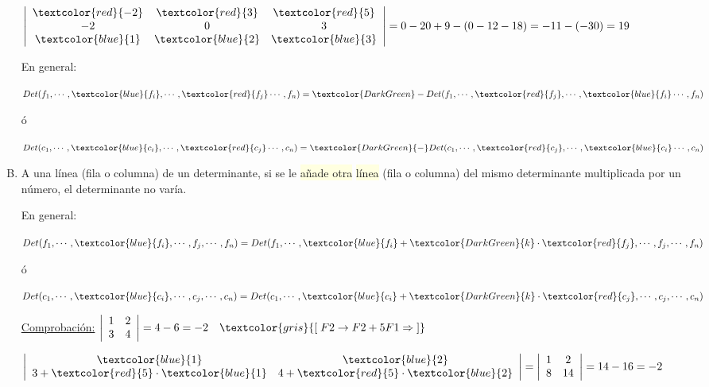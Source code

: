 \begin{enumerate}[P.D. 1]
 $\left| \begin{array}{ccc} \textcolor{red}{-2}& \textcolor{red}{3}& \textcolor{red}{5} \\-2&0&3\\ \textcolor{blue}{1}& \textcolor{blue}{2}& \textcolor{blue}{3}  \end{array} \right|= 
0-20+9-(0-12-18)=-11-(-30)=19$

En general: 

$Det(f_1, \cdots , \textcolor{blue}{f_i}, \cdots , \textcolor{red}{f_j} \cdots , f_n)=\textcolor{DarkGreen}- Det(f_1, \cdots , \textcolor{red}{f_j}, \cdots , \textcolor{blue}{f_i} \cdots , f_n)$

ó 

$Det(c_1, \cdots , \textcolor{blue}{c_i}, \cdots , \textcolor{red}{c_j} \cdots , c_n)=\textcolor{DarkGreen}{-} Det(c_1, \cdots , \textcolor{red}{c_j}, \cdots , \textcolor{blue}{c_i} \cdots , c_n)$

\item A una línea (fila o columna) de un determinante, si se le \colorbox{LightYellow}{añade otra} \colorbox{LightYellow}{línea} (fila o columna) del mismo determinante multiplicada por un número, el determinante no varía.

En general:

\small{$Det(f_1, \cdots , \textcolor{blue}{f_i},\cdots , f_j,  \cdots , f_n)= Det(f_1, \cdots , \textcolor{blue}{f_i}+ \textcolor{DarkGreen}{k}\cdot  \textcolor{red}{f_j}, \cdots, f_j,  \cdots , f_n)$} 

\normalsize{ó} 

\small{$Det(c_1, \cdots , \textcolor{blue}{c_i},\cdots , c_j,  \cdots , c_n)= Det(c_1, \cdots , \textcolor{blue}{c_i}+ \textcolor{DarkGreen}{k}\cdot  \textcolor{red}{c_j}, \cdots, c_j,  \cdots , c_n)$} 

\normalsize{\underline{Comprobación:}} $\left| \begin{array}{cc} 1&2\\3&4 \end{array} \right|=4-6=-2 \quad \textcolor{gris}{[\; F2 \to F2+5F1 \Rightarrow\; ]}$

$\left| \begin{array}{cc} \textcolor{blue}{1}&\textcolor{blue}{2}\\3+\textcolor{red}{5}\cdot \textcolor{blue}{1}&4+\textcolor{red}{5}\cdot \textcolor{blue}{2} \end{array} \right|=\left| \begin{array}{cc} 1&2\\8&14 \end{array} \right|=14-16=-2$


\end{enumerate}
